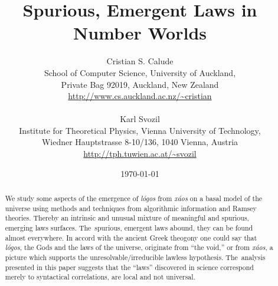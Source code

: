 \documentclass[12pt]{article}
\begin{document}
\title{Spurious,
Emergent
Laws in Number Worlds}

\author{Cristian S. Calude \\
        {\small   School of Computer Science, University of Auckland,} \\
        {\small   Private Bag 92019, Auckland, New Zealand}  \\
   {\small  \url{http://www.cs.auckland.ac.nz/~cristian}   }  \\
{\small }\\
        Karl Svozil \\
        {\small   Institute for Theoretical Physics, Vienna University of Technology,} \\
        {\small   Wiedner Hauptstrasse 8-10/136, 1040 Vienna, Austria}\\
{\small   \url{http://tph.tuwien.ac.at/~svozil}}
       }

\date{\today}

\maketitle

\thispagestyle{empty}
\begin{abstract}
We study some aspects of the emergence  of {\it l\'ogos} from {\it x\'aos} on a basal model of the universe using methods and techniques from algorithmic information and Ramsey theories. Thereby an intrinsic and unusual mixture of meaningful and  spurious, emerging laws surfaces. The~spurious, emergent  laws abound,  they can be found almost everywhere. In accord with the ancient Greek theogony one could say that {\it l\'ogos}, the Gods and the laws of the universe, originate from ``the void,'' or from {\it x\'aos}, a picture which supports  the unresolvable/irreducible lawless hypothesis. The~analysis presented in this paper suggests that the ``laws'' discovered in science correspond merely to syntactical correlations, are local and not universal.
\end{abstract}
\end{document}
